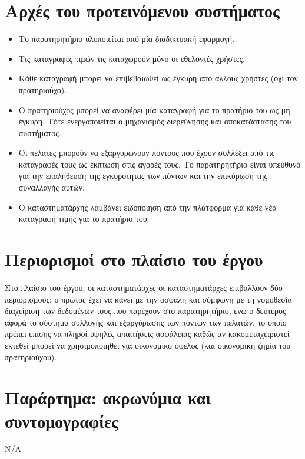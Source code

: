 \documentclass[a4paper,oneside, 12pt]{article}
\begin{document}
\section{Αρχές του προτεινόμενου συστήματος}

\begin{itemize}
	\item Το παρατηρητήριο υλοποιείται από μία διαδικτυακή εφαρμογή.
	\item Τις καταγραφές τιμών τις καταχωρούν μόνο οι εθελοντές χρήστες.
	\item Κάθε καταγραφή μπορεί να επιβεβαιωθεί ως έγκυρη από άλλους χρήστες (όχι τον
	πρατηριούχο).
	\item Ο πρατηριούχος μπορεί να αναφέρει μία καταγραφή για το πρατήριο του ως μη
	έγκυρη. Τότε ενεργοποιείται ο μηχανισμός διερεύνησης και αποκατάστασης του
	συστήματος.
	\item Οι πελάτες μπορούν να εξαργυρώνουν πόντους που έχουν συλλέξει από τις
	καταγραφές τους ως έκπτωση στις αγορές τους. Το παρατηρητήριο είναι υπεύθυνο για την επαλήθευση της εγκυρότητας των πόντων και την επικύρωση
	της συναλλαγής αυτών.
	\item 	Ο καταστηματάρχης λαμβάνει ειδοποίηση από την πλατφόρμα για κάθε νέα
	καταγραφή τιμής για το πρατήριο του.
\end{itemize}

\section{Περιορισμοί στο πλαίσιο του έργου}

Στο πλαίσιο του έργου, οι καταστηματάρχες οι καταστηματάρχες επιβάλλουν δύο
περιορισμούς: ο πρώτος έχει να κάνει με την ασφαλή και σύμφωνη με τη νομοθεσία
διαχείριση των δεδομένων τους που παρέχουν στο παρατηρητήριο, ενώ ο δεύτερος
αφορά το σύστημα συλλογής και εξαργύρωσης των πόντων των πελατών, το οποίο
πρέπει επίσης να πληροί υψηλές απαιτήσεις ασφάλειας καθώς αν κακομεταχειριστεί
εκτεθεί μπορεί να χρησιμοποιηθεί για οικονομικό όφελος (και οικονομική ζημία του
πρατηριούχου).

\section{Παράρτημα: ακρωνύμια και συντομογραφίες}

Ν/Α
\end{document}

